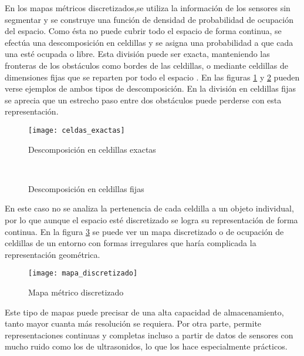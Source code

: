 En los mapas métricos discretizados,se utiliza la información de los sensores sin segmentar y se construye una función de densidad de probabilidad de ocupación del espacio. Como ésta no puede cubrir todo el espacio de forma continua, se efectúa una descomposición en celdillas y se asigna una probabilidad a que cada una esté ocupada o libre. Esta división puede ser exacta, manteniendo las fronteras de los obstáculos como bordes de las celdillas, o mediante celdillas de dimensiones fijas que se reparten por todo el espacio \cite{Siegwart04}. En las figuras \ref{fg:exactas} y \ref{fg:fijas} pueden verse ejemplos de ambos tipos de descomposición. En la división en celdillas fijas se aprecia que un estrecho paso entre dos obstáculos puede perderse con esta representación.

 \begin{figure}[hbt]
  \centering\texttt{[image: celdas\_exactas]}\\
  \caption{Descomposición en celdillas exactas}\label{fg:exactas}
\end{figure}

\begin{figure}[hbt]
    \\
  \caption{Descomposición en celdillas fijas}\label{fg:fijas}
\end{figure}


 En este caso no se analiza la pertenencia de cada celdilla a un objeto individual, por lo que aunque el espacio esté discretizado se logra su representación de forma continua. En la figura \ref{fg:discretizado} se puede ver un mapa discretizado o de ocupación de celdillas de un entorno con formas irregulares que haría complicada la representación geométrica.

\begin{figure}[hbtp]
  \centering\texttt{[image: mapa\_discretizado]}\\
  \caption{Mapa métrico discretizado}\label{fg:discretizado}
\end{figure}

Este tipo de mapas puede precisar de una alta capacidad de almacenamiento, tanto mayor cuanta más resolución se requiera. Por otra parte, permite representaciones continuas y completas incluso a partir de datos de sensores con mucho ruido como los de ultrasonidos, lo que los hace especialmente prácticos.

